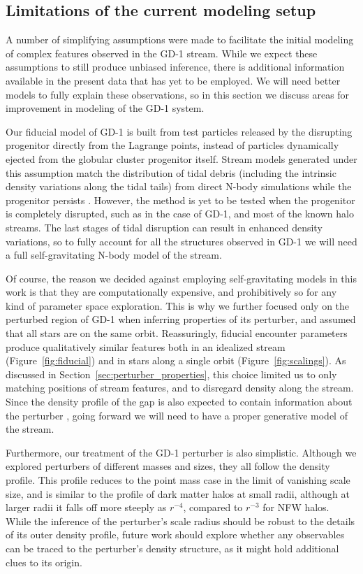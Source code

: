 \documentclass[twocolumn]{aastex62}
\begin{document}
\subsection{Limitations of the current modeling setup}
\label{sec:caveats}
A number of simplifying assumptions were made to facilitate the initial modeling of complex features observed in the GD-1 stream.
While we expect these assumptions to still produce unbiased inference, there is additional information available in the present data that has yet to be employed.
We will need better models to fully explain these observations, so in this section we discuss areas for improvement in modeling of the GD-1 system.

Our fiducial model of GD-1 is built from test particles released by the disrupting progenitor directly from the Lagrange points, instead of particles dynamically ejected from the globular cluster progenitor itself.
Stream models generated under this assumption match the distribution of tidal debris (including the intrinsic density variations along the tidal tails) from direct N-body simulations while the progenitor persists \citep[e.g.,][]{kupper2012,fardal2015}.
However, the method is yet to be tested when the progenitor is completely disrupted, such as in the case of GD-1, and most of the known halo streams.
The last stages of tidal disruption can result in enhanced density variations, so to fully account for all the structures observed in GD-1 we will need a full self-gravitating N-body model of the stream.

Of course, the reason we decided against employing self-gravitating models in this work is that they are computationally expensive, and prohibitively so for any kind of parameter space exploration.
This is why we further focused only on the perturbed region of GD-1 when inferring properties of its perturber, and assumed that all stars are on the same orbit.
Reassuringly, fiducial encounter parameters produce qualitatively similar features both in an idealized stream (Figure~\ref{fig:fiducial}) and in stars along a single orbit (Figure~\ref{fig:scalings}).
As discussed in Section~\ref{sec:perturber_properties}, this choice limited us to only matching positions of stream features, and to disregard density along the stream.
Since the density profile of the gap is also expected to contain information about the perturber \citep{eb2015b}, going forward we will need to have a proper generative model of the stream.

Furthermore, our treatment of the GD-1 perturber is also simplistic.
Although we explored perturbers of different masses and sizes, they all follow the \citet{hernquist1990} density profile.
This profile reduces to the point mass case in the limit of vanishing scale size, and is similar to the profile of dark matter halos \citep[NFW,][]{navarro1997} at small radii, although at larger radii it falls off more steeply as $r^{-4}$, compared to $r^{-3}$ for NFW halos.
While the inference of the perturber's scale radius should be robust to the details of its outer density profile, future work should explore whether any observables can be traced to the perturber's density structure, as it might hold additional clues to its origin.
\end{document}
